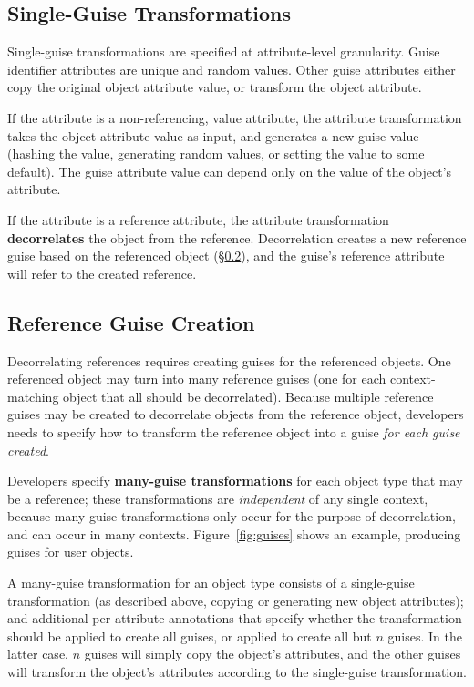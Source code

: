 \subsection{Single-Guise Transformations}
\label{sec:single_guise} 
Single-guise transformations are specified at attribute-level granularity. 
Guise identifier attributes are unique and random values. 
%
Other guise attributes either copy the original object attribute value, 
or transform the object attribute.  

If the attribute is a non-referencing, value attribute, the attribute transformation takes the
object attribute value as input, and generates a new guise value (\eg hashing the value, generating
random values, or setting the value to some default).  The guise attribute value can depend only on
the value of the object's attribute.

If the attribute is a reference attribute, the attribute transformation \textbf{decorrelates} the 
object from the reference. Decorrelation creates a new reference guise based on the referenced
object (\S\ref{sec:reference_guises}), and the guise's reference attribute will refer to the
created reference.

\subsection{Reference Guise Creation}
\label{sec:reference_guises} 
%
Decorrelating references requires creating guises for the referenced objects. One referenced object may turn into many
reference guises (one for each context-matching object that all should be decorrelated).  Because
multiple reference guises may be created to decorrelate objects from the reference object,
developers needs to specify how to transform the reference object into a guise \emph{for each guise
created}.

%
Developers specify \textbf{many-guise transformations} for each object type that may be a reference;
these transformations are \emph{independent} of any single context, because many-guise
transformations only occur for the purpose of decorrelation, and can occur in many contexts.
%
Figure~\ref{fig:guises} shows an example, producing guises for user objects.

A many-guise transformation for an object type consists of a single-guise transformation (as
described above, \ie copying or generating new object attributes); and additional per-attribute
annotations that specify whether the transformation should be applied to create all guises, or
applied to create all but $n$ guises. In the latter case, $n$ guises will simply copy the
object's attributes, and the other guises will transform the object's attributes according to the
single-guise transformation.

